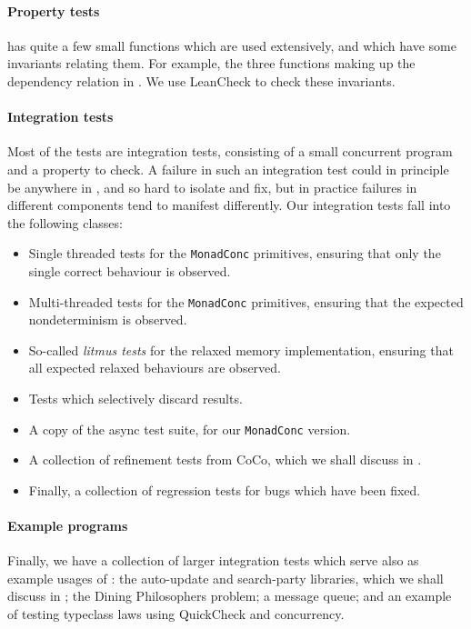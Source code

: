 \paragraph{Property tests}
\dejafu{} has quite a few small functions which are used extensively,
and which have some invariants relating them.  For example, the three
functions making up the dependency relation in
.  We use LeanCheck\cite{leancheck} to check
these invariants.

\paragraph{Integration tests}
Most of the tests are integration tests, consisting of a small
concurrent program and a property to check.  A failure in such an
integration test could in principle be anywhere in \dejafu{}, and so
hard to isolate and fix, but in practice failures in different
components tend to manifest differently.  Our integration tests fall
into the following classes:

\begin{itemize}
\item Single threaded tests for the \verb|MonadConc| primitives,
  ensuring that only the single correct behaviour is observed.
\item Multi-threaded tests for the \verb|MonadConc| primitives,
  ensuring that the expected nondeterminism is observed.
\item So-called \emph{litmus tests} for the relaxed memory
  implementation, ensuring that all expected relaxed behaviours are
  observed.
\item Tests which selectively discard results.
\item A copy of the async\cite{async} test suite, for our
  \verb|MonadConc| version.
\item A collection of refinement tests from CoCo, which we shall
  discuss in .
\item Finally, a collection of regression tests for bugs which have
  been fixed.
\end{itemize}

\paragraph{Example programs}
Finally, we have a collection of larger integration tests which serve
also as example usages of \dejafu{}: the auto-update\cite{auto_update}
and search-party\cite{search_party} libraries, which we shall discuss
in ; the Dining Philosophers problem; a
message queue; and an example of testing typeclass laws using
QuickCheck\cite{claessen2000} and concurrency.

